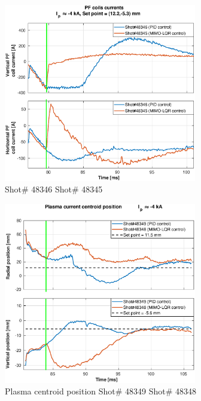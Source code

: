 \begin{figure}
	\centering
	\includegraphics[width=0.75\textwidth]{Chp5/PIDvsMIMO_346_345_curr_2.eps}
	\caption{ Shot\# 48346 Shot\# 48345}
\end{figure}

\begin{figure}
	\centering
	\includegraphics[width=0.75\textwidth]{Chp5/PIDvsMIMO_349_348_2.eps}
	\caption{Plasma centroid position Shot\# 48349 Shot\# 48348}
\end{figure}

